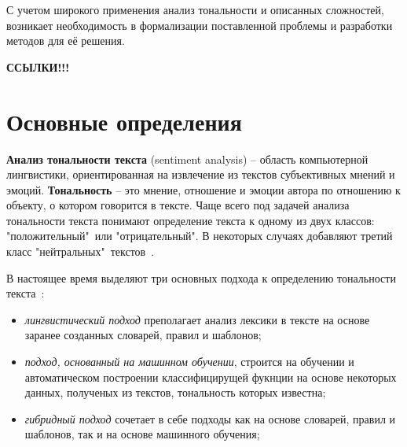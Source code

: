 С учетом широкого применения анализ тональности и описанных сложностей,
возникает необходимость в формализации поставленной проблемы и разработки
методов для её решения.

\textbf{ССЫЛКИ!!!}

\section{Основные определения}

\textbf{Анализ тональности текста} (sentiment analysis) -- область компьютерной
лингвистики, ориентированная на извлечение из текстов субъективных мнений и
эмоций. \textbf{Тональность} -- это мнение, отношение и эмоции автора по
отношению к объекту, о котором говорится в тексте.  Чаще всего под задачей
анализа тональности текста понимают определение текста к одному из двух классов:
"положительный"\ или "отрицательный". В некоторых случаях добавляют третий класс
"нейтральных"\ текстов~\cite{article9}.

В настоящее время выделяют три основных подхода к определению тональности
текста~\cite{article9}:
\begin{itemize}
    \item \textit{лингвистический подход} преполагает анализ лексики в тексте на
        основе заранее созданных словарей, правил и шаблонов;

    \item \textit{подход, основанный на машинном обучении}, строится на обучении и
        автоматическом построении классифицирущей фукнции на основе
        некоторых данных, полученых из текстов, тональность которых
        известна;

    \item \textit{гибридный подход} сочетает в себе подходы как на основе
        словарей, правил и шаблонов, так и на основе машинного обучения;
\end{itemize}

